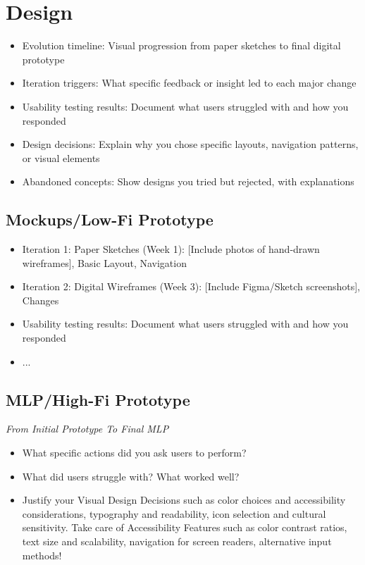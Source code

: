 \section{Design}

\begin{itemize}
    \item Evolution timeline: Visual progression from paper sketches to final digital prototype
    \item Iteration triggers: What specific feedback or insight led to each major change
    \item Usability testing results: Document what users struggled with and how you responded
    \item Design decisions: Explain why you chose specific layouts, navigation patterns, or visual elements
    \item Abandoned concepts: Show designs you tried but rejected, with explanations
\end{itemize}

\subsection{Mockups/Low-Fi Prototype}

\begin{itemize}
    \item Iteration 1: Paper Sketches (Week 1): [Include photos of hand-drawn wireframes], Basic Layout, Navigation
    \item Iteration 2: Digital Wireframes (Week 3):
[Include Figma/Sketch screenshots], Changes
    \item Usability testing results: Document what users struggled with and how you responded
    \item ...
\end{itemize}

\subsection{MLP/High-Fi Prototype}
\emph{From Initial Prototype To Final MLP}

\begin{itemize}
    \item What specific actions did you ask users to perform?
    \item What did users struggle with? What worked well?
    \item Justify your Visual Design Decisions such as color choices and accessibility considerations, typography and readability, icon selection and cultural sensitivity. Take care of Accessibility Features such as color contrast ratios, text size and scalability, navigation for screen readers, alternative input methods!
\end{itemize}
